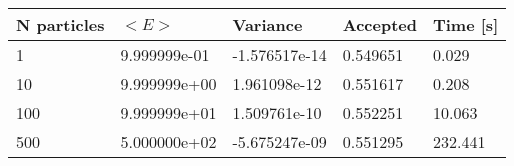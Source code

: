 \begin{table}[h!]
\centering 
\begin{tabular}{|l|l|l|l|l|}
\hline 
N particles & $<E>$ & Variance & Accepted & Time [s]\\ 
 \hline 
1 & 9.999999e-01 & -1.576517e-14 & 0.549651 & 0.029 \\ \hline 
10 & 9.999999e+00 & 1.961098e-12 & 0.551617 & 0.208 \\ \hline 
100 & 9.999999e+01 & 1.509761e-10 & 0.552251 & 10.063 \\ \hline 
500 & 5.000000e+02 & -5.675247e-09 & 0.551295 & 232.441 \\ \hline 
\end{tabular}
\label{tab:hn2} 
\end{table} 
